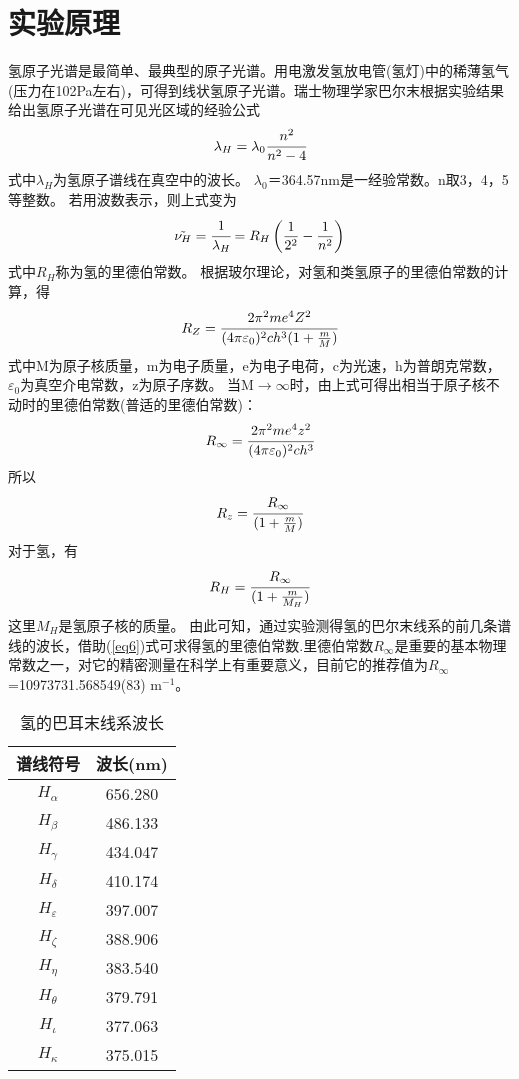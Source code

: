 \documentclass[a4paper]{article}
\begin{document}
\section{实验原理}
氢原子光谱是最简单、最典型的原子光谱。用电激发氢放电管(氢灯)中的稀薄氢气(压力在102Pa左右)，可得到线状氢原子光谱。瑞士物理学家巴尔末根据实验结果给出氢原子光谱在可见光区域的经验公式
\begin{equation}
\lambda_H = \lambda_0\cfrac{n^2}{n^2-4}
\end{equation}
式中$\lambda_H$为氢原子谱线在真空中的波长。
$\lambda_0$＝364.57nm是一经验常数。n取3，4，5等整数。 若用波数表示，则上式变为
\begin{equation}
\tilde{\nu_H} = \cfrac{1}{\lambda_H} = R_H\left(\frac{1}{2^2} - \frac{1}{n^2}\right)
\end{equation}
式中$R_H$称为氢的里德伯常数。
根据玻尔理论，对氢和类氢原子的里德伯常数的计算，得
\begin{equation}
R_Z = \cfrac{2\pi^2me^4Z^2}{(4\pi\varepsilon_0)^2ch^3(1+\frac{m}{M})}
\end{equation}
式中M为原子核质量，m为电子质量，e为电子电荷，c为光速，h为普朗克常数，$\varepsilon_0$为真空介电常数，z为原子序数。 
当M$\to \infty$时，由上式可得出相当于原子核不动时的里德伯常数(普适的里德伯常数)：
\begin{equation}
R_{\infty} = \cfrac{2\pi^2me^4z^2}{(4\pi\varepsilon_0)^2ch^3}
\end{equation}
所以
\begin{equation}
R_z = \cfrac{R_{\infty}}{(1+\frac{m}{M})}
\end{equation}
对于氢，有
\begin{equation}
R_H = \cfrac{R_{\infty}}{(1+\frac{m}{M_H})}\label{eq6}
\end{equation}
这里$M_H$是氢原子核的质量。
由此可知，通过实验测得氢的巴尔末线系的前几条谱线的波长，借助(\ref{eq6})式可求得氢的里德伯常数.里德伯常数$R_{\infty}$是重要的基本物理常数之一，对它的精密测量在科学上有重要意义，目前它的推荐值为$R_{\infty}$=10973731.568549(83)$\text{ m}^{-1}$。
\begin{table}[!h]
\centering
\caption{氢的巴耳末线系波长}
\label{table1}
\begin{tabular}{|c|c|}
\hline
谱线符号              & 波长(nm)  \\ \hline
$H_{\alpha}$      & 656.280 \\ \hline
$H_{\beta}$       & 486.133 \\ \hline
$H_{\gamma}$      & 434.047 \\ \hline
$H_{\delta}$      & 410.174 \\ \hline
$H_{\varepsilon}$ & 397.007 \\ \hline
$H_{\zeta}$       & 388.906 \\ \hline
$H_{\eta}$        & 383.540 \\ \hline
$H_{\theta}$      & 379.791 \\ \hline
$H_{\iota}$       & 377.063 \\ \hline
$H_{\kappa}$      & 375.015 \\ \hline
\end{tabular}
\end{table}
\end{document}
